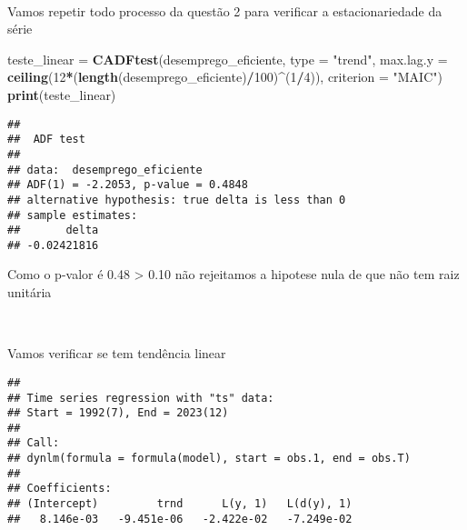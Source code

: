 \documentclass[
]{article}
\newenvironment{Shaded}{\begin{snugshade}}{\end{snugshade}}
\newcommand{\AttributeTok}[1]{\textcolor[rgb]{0.13,0.29,0.53}{#1}}
\newcommand{\DecValTok}[1]{\textcolor[rgb]{0.00,0.00,0.81}{#1}}
\newcommand{\FunctionTok}[1]{\textcolor[rgb]{0.13,0.29,0.53}{\textbf{#1}}}
\newcommand{\NormalTok}[1]{#1}
\newcommand{\OtherTok}[1]{\textcolor[rgb]{0.56,0.35,0.01}{#1}}
\newcommand{\SpecialCharTok}[1]{\textcolor[rgb]{0.81,0.36,0.00}{\textbf{#1}}}
\newcommand{\StringTok}[1]{\textcolor[rgb]{0.31,0.60,0.02}{#1}}
\begin{document}
~

Vamos repetir todo processo da questão 2 para verificar a
estacionariedade da série

\begin{Shaded}
\begin{Highlighting}[]
\NormalTok{teste\_linear }\OtherTok{=} \FunctionTok{CADFtest}\NormalTok{(desemprego\_eficiente, }\AttributeTok{type =} \StringTok{"trend"}\NormalTok{, }\AttributeTok{max.lag.y =} \FunctionTok{ceiling}\NormalTok{(}\DecValTok{12}\SpecialCharTok{*}\NormalTok{(}\FunctionTok{length}\NormalTok{(desemprego\_eficiente)}\SpecialCharTok{/}\DecValTok{100}\NormalTok{)}\SpecialCharTok{\^{}}\NormalTok{(}\DecValTok{1}\SpecialCharTok{/}\DecValTok{4}\NormalTok{)),}
                 \AttributeTok{criterion =} \StringTok{"MAIC"}\NormalTok{)}
\FunctionTok{print}\NormalTok{(teste\_linear)}
\end{Highlighting}
\end{Shaded}

\begin{verbatim}
## 
##  ADF test
## 
## data:  desemprego_eficiente
## ADF(1) = -2.2053, p-value = 0.4848
## alternative hypothesis: true delta is less than 0
## sample estimates:
##       delta 
## -0.02421816
\end{verbatim}

Como o p-valor é 0.48 \textgreater{} 0.10 não rejeitamos a hipotese nula
de que não tem raiz unitária

~

Vamos verificar se tem tendência linear

\begin{Shaded}
\end{Shaded}

\begin{verbatim}
## 
## Time series regression with "ts" data:
## Start = 1992(7), End = 2023(12)
## 
## Call:
## dynlm(formula = formula(model), start = obs.1, end = obs.T)
## 
## Coefficients:
## (Intercept)         trnd      L(y, 1)   L(d(y), 1)  
##   8.146e-03   -9.451e-06   -2.422e-02   -7.249e-02
\end{verbatim}

\begin{Shaded}
\end{Shaded}
\end{document}
